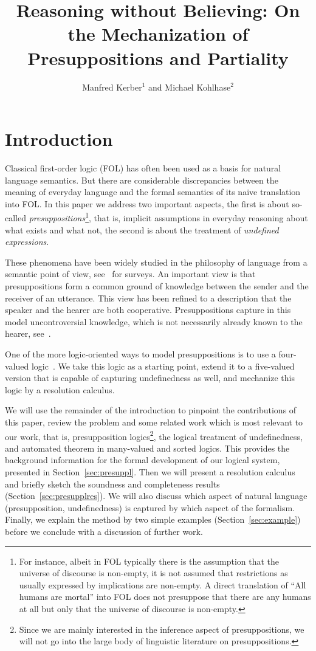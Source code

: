 \documentclass{\filespath jancl}
\title[Reasoning with Presuppositions]{Reasoning without Believing: On the Mechanization of Presuppositions and Partiality}
\author{Manfred Kerber$^1$ and Michael Kohlhase$^2$}
\begin{document}
\maketitle

\section{Introduction}
\label{sec:intro}

Classical first-order logic (FOL) has often been used as a basis for
natural language semantics. But there are considerable discrepancies
between the meaning of everyday language and the formal semantics of
its naive translation into FOL.  In this paper we address two
important aspects, the first is about so-called
{\em presuppositions\/}\footnote{For instance, albeit in FOL typically there is the
  assumption that the universe of discourse is non-empty, it is not
  assumed that restrictions as usually expressed by implications are
  non-empty.  A direct translation of ``All humans are mortal'' into
  FOL does not presuppose that there are any humans at all but only that the
  universe of discourse is non-empty.}, that is,
implicit assumptions in everyday reasoning about what exists and what
not, the second is about the treatment of {\em undefined expressions}.

These phenomena have been widely studied in the philosophy of language from a semantic
point of view, see~\cite{Beaver:p97,BeaZee:a07} for surveys. An
important view is that presuppositions form a common ground of
knowledge between the sender and the receiver of an utterance. This
view has been refined to a description that the speaker and the hearer
are both cooperative. Presuppositions capture in this model
uncontroversial knowledge, which is not necessarily already known to
the hearer, see~\cite{Simons06}. 

One of the more logic-oriented ways to model presuppositions
is to use a four-valued logic~\cite{Bergmann:patdl81}. We
take this logic as a starting point, extend it to a five-valued
version that is capable of capturing undefinedness as well, and
mechanize this logic by a resolution calculus.


We will use the remainder of the introduction to pinpoint the
contributions of this paper, review the problem and some related work
which is most relevant to our work, that is, presupposition
logics\footnote{Since we are mainly interested in the inference aspect
  of presuppositions, we will not go into the large body of linguistic
  literature on presuppositions.}, the logical treatment of
undefinedness, and automated theorem in many-valued and sorted
logics. This provides the background information for the formal
development of our logical system, presented in
Section~\ref{sec:presuppl}. Then we will present a resolution calculus
and briefly sketch the soundness and completeness results
(Section~\ref{sec:presupplres}). We will also discuss which aspect of
natural language (presupposition, undefinedness) is captured by which
aspect of the formalism. Finally, we explain the method by two simple
examples (Section~\ref{sec:example}) before we conclude with a
discussion of further work.
\end{document}

